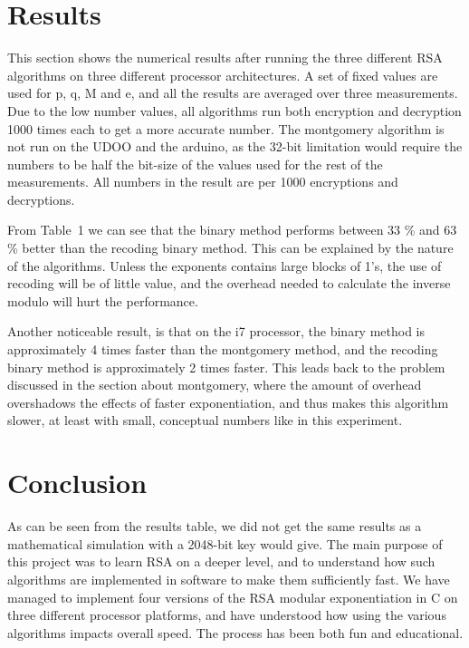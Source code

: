 \documentclass[twocolumn]{IEEEtran}
\begin{document}
\section{Results}
This section shows the numerical results after running the three different RSA algorithms on three different processor architectures. A set of fixed values are used for p, q, M and e, and all the results are averaged over three measurements. Due to the low number values, all algorithms run both encryption and decryption 1000 times each to get a more accurate number. The montgomery algorithm is not run on the UDOO and the arduino, as the 32-bit limitation would require the numbers to be half the bit-size of the values used for the rest of the measurements. All numbers in the result are per 1000 encryptions and decryptions.



From Table~1 we can see that the binary method performs between 33 \% and 63 \% better than the recoding binary method. This can be explained by the nature of the algorithms. Unless the exponents contains large blocks of 1’s, the use of recoding will be of little value, and the overhead needed to calculate the inverse modulo will hurt the performance.

Another noticeable result, is that on the i7 processor, the binary method is approximately 4 times faster than the montgomery method, and the recoding binary method is approximately 2 times faster. This leads back to the problem discussed in the section about montgomery, where the amount of overhead overshadows the effects of faster exponentiation, and thus makes this algorithm slower, at least with small, conceptual numbers like in this experiment.

\section{Conclusion}
As can be seen from the results table, we did not get the same results as a mathematical simulation with a 2048-bit key would give. The main purpose of this project was to learn RSA on a deeper level, and to understand how such algorithms are implemented in software to make them sufficiently fast.  We have managed to implement four versions of the RSA modular exponentiation in C on three different processor platforms, and have understood how using the various algorithms impacts overall speed. The process has been both fun and educational.



\end{document}
